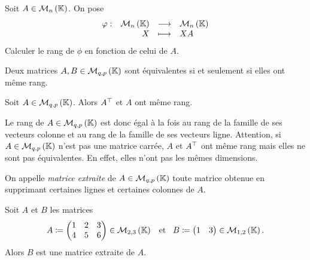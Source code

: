 \documentclass{magnolia}
\begin{document}
\begin{exoUnique}
\exo Soit $A\in\mathcal{M}_{n}\left(\mathbb{K}\right)$. On pose
  \[\begin{array}[t]{lrcl} \displaystyle{\varphi} : & \displaystyle{\mathcal{M}_{n}\left(\ensuremath{\mathbb{K}}\right)} & \longrightarrow & \displaystyle{\mathcal{M}_{n}\left(\ensuremath{\mathbb{K}}\right)} \\ & \displaystyle{X} & \longmapsto & \displaystyle{XA} \end{array}\]
  Calculer le rang de $\phi$ en fonction de celui de $A$.
\end{exoUnique}

\begin{proposition}[utile=3]
Deux matrices $A,B\in\mathcal{M}_{q,p}\left(\mathbb{K}\right)$ sont équivalentes si et seulement si elles
ont même rang.
\end{proposition}

\begin{proposition}[utile=2]
Soit $A\in\mathcal{M}_{q,p}\left(\mathbb{K}\right)$. Alors ${A}^{\top}$ et $A$ ont même rang.
\end{proposition}

\begin{remarques}
\remarque 
Le rang de $A\in\mathcal{M}_{q,p}\left(\mathbb{K}\right)$ est donc égal à la fois au rang de la famille de ses
  vecteurs colonne et au rang de la famille de ses vecteurs ligne.
\remarque Attention, si $A\in\mathcal{M}_{q,p}\left(\mathbb{K}\right)$ n'est pas une matrice carrée, $A$ et ${A}^{\top}$
  ont même rang mais elles ne sont pas équivalentes. En effet, elles n'ont pas les mêmes dimensions.
\end{remarques}



\begin{definition}[utile=-3]
  On appelle \emph{matrice extraite} de $A\in\mathcal{M}_{q,p}\left(\mathbb{K}\right)$ toute matrice obtenue en \og supprimant \fg certaines lignes et certaines colonnes de $A$.
  \end{definition}


\begin{exempleUnique}
\exemple Soit $A$ et $B$ les matrices
  \[A\coloneqq
    \begin{pmatrix}
    1 & 2 & 3\\
    4 & 5 & 6
    \end{pmatrix}\in\mathcal{M}_{2,3}\left(\mathbb{K}\right) \quad\!\text{et}\quad\!
    B\coloneqq
    \begin{pmatrix}
    1 & 3
    \end{pmatrix}\in\mathcal{M}_{1,2}\left(\mathbb{K}\right).\]
  Alors $B$ est une matrice extraite de $A$.
\end{exempleUnique}
\end{document}
